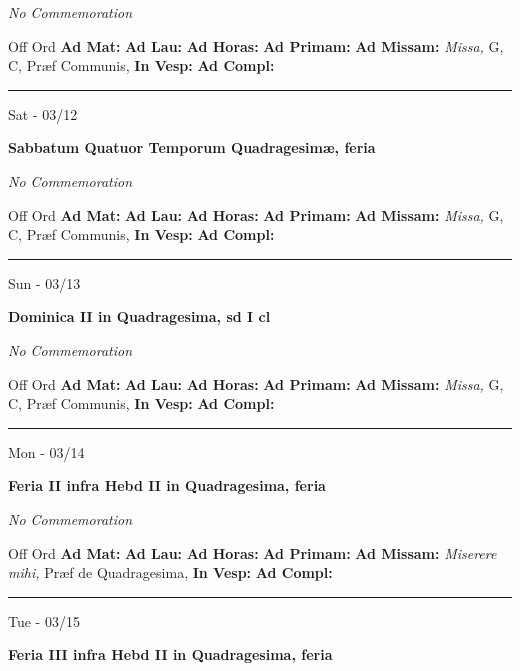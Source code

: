 \documentclass[letterpaper, 10pt]{article}
\begin{document}
\textit{No Commemoration}\begin{justify}
Off Ord
\textbf{Ad Mat: }
\textbf{Ad Lau: }
\textbf{Ad Horas: }
\textbf{Ad Primam: }
\textbf{Ad Missam:} \textit{Missa, } G, C, Præf Communis, 
\textbf{In Vesp: }
\textbf{Ad Compl: }\end{justify}



\hrule
\begin{center}
Sat - 03/12
\end{center}\textbf{ \large Sabbatum Quatuor Temporum Quadragesimæ, \textnormal{\normalsize feria}}

\textit{No Commemoration}\begin{justify}
Off Ord
\textbf{Ad Mat: }
\textbf{Ad Lau: }
\textbf{Ad Horas: }
\textbf{Ad Primam: }
\textbf{Ad Missam:} \textit{Missa, } G, C, Præf Communis, 
\textbf{In Vesp: }
\textbf{Ad Compl: }\end{justify}



\hrule
\begin{center}
Sun - 03/13
\end{center}\textbf{ \large Dominica II in Quadragesima, \textnormal{\normalsize sd I cl}}

\textit{No Commemoration}\begin{justify}
Off Ord
\textbf{Ad Mat: }
\textbf{Ad Lau: }
\textbf{Ad Horas: }
\textbf{Ad Primam: }
\textbf{Ad Missam:} \textit{Missa, } G, C, Præf Communis, 
\textbf{In Vesp: }
\textbf{Ad Compl: }\end{justify}



\hrule
\begin{center}
Mon - 03/14
\end{center}\textbf{ \large Feria II infra Hebd II in Quadragesima, \textnormal{\normalsize feria}}

\textit{No Commemoration}\begin{justify}
Off Ord
\textbf{Ad Mat: }
\textbf{Ad Lau: }
\textbf{Ad Horas: }
\textbf{Ad Primam: }
\textbf{Ad Missam:} \textit{Miserere mihi, } Præf de Quadragesima, 
\textbf{In Vesp: }
\textbf{Ad Compl: }\end{justify}



\hrule
\begin{center}
Tue - 03/15
\end{center}\textbf{ \large Feria III infra Hebd II in Quadragesima, \textnormal{\normalsize feria}}
\end{document}
